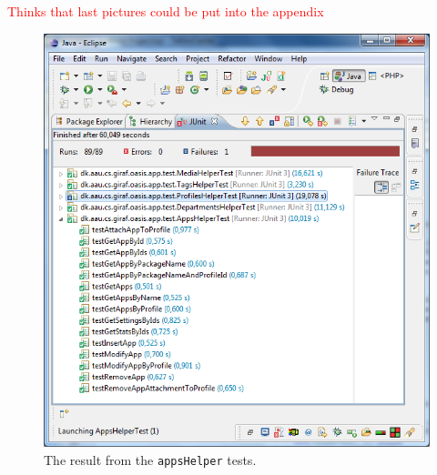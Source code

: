 \textcolor{red}{Thinks that last pictures could be put into the appendix}

\begin{figure}[htbp]
	\centering
		\includegraphics[width=\textwidth]{Images/unit_testing/app_helper_tests.PNG}
	\caption{The result from the \texttt{appsHelper} tests.}
	\label{fig:app_helper_tests}
\end{figure}

